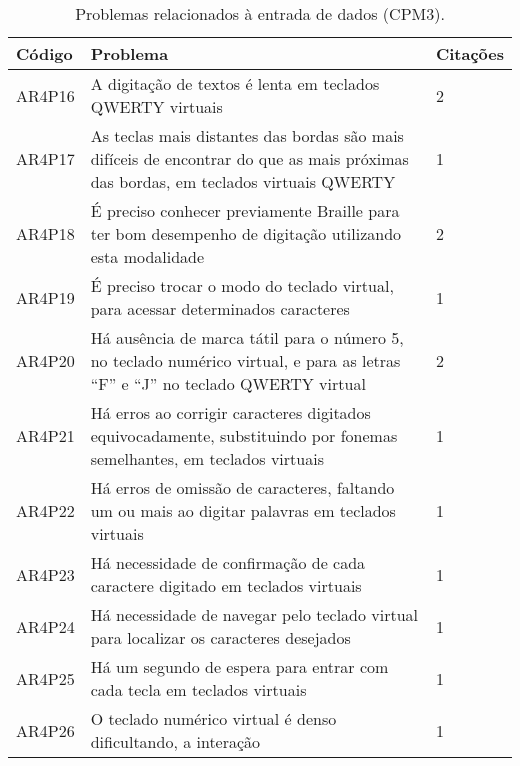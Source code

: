 \begin{table}[htb]
  \begin{center}
    \ABNTEXfontereduzida
    \caption{Problemas relacionados à entrada de dados (CPM3).}
    \label{tab-pro-ent-dad-1}
    \begin{tabular}{p{1.2cm}|p{12.0cm}|p{1.3cm}}
      \textbf{Código} & \textbf{Problema}                                                                                                                  & \textbf{Citações} \\
      \hline
      AR4P16          & A digitação de textos é lenta em teclados QWERTY virtuais                                                                          & 2                 \\
      \hline
      AR4P17          & As teclas mais distantes das bordas são mais difíceis de encontrar do que as mais próximas das bordas, em teclados virtuais QWERTY & 1                 \\
      \hline
      AR4P18          & É preciso conhecer previamente Braille para ter bom desempenho de digitação utilizando esta modalidade                             & 2                 \\
      \hline
      AR4P19          & É preciso trocar o modo do teclado virtual, para acessar determinados caracteres                                                   & 1                 \\
      \hline
      AR4P20          & Há ausência de marca tátil para o número 5, no teclado numérico virtual, e para as letras “F” e “J” no teclado QWERTY virtual      & 2                 \\
      \hline
      AR4P21          & Há erros ao corrigir caracteres digitados equivocadamente, substituindo por fonemas semelhantes, em teclados virtuais              & 1                 \\
      \hline
      AR4P22          & Há erros de omissão de caracteres, faltando um ou mais ao digitar palavras em teclados virtuais                                    & 1                 \\
      \hline
      AR4P23          & Há necessidade de confirmação de cada caractere digitado em teclados virtuais                                                      & 1                 \\
      \hline
      AR4P24          & Há necessidade de navegar pelo teclado virtual para localizar os caracteres desejados                                              & 1                 \\
      \hline
      AR4P25          & Há um segundo de espera para entrar com cada tecla em teclados virtuais                                                            & 1                 \\
      \hline
      AR4P26          & O teclado numérico virtual é denso dificultando, a interação                                                                       & 1                 \\
    \end{tabular}
  \end{center}
\end{table}

